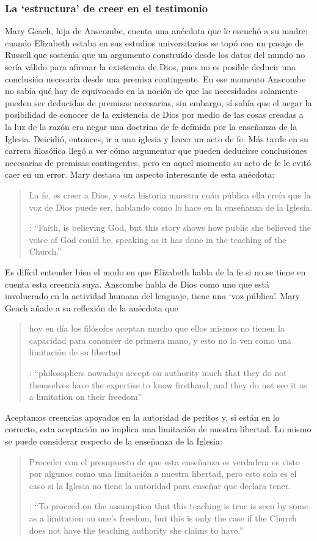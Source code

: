 \subsubsection{La `estructura' de creer en el testimonio}

Mary Geach, hija de Anscombe, cuenta una anécdota que le escuchó a su madre; cuando Elizabeth estaba en sus estudios universitarios se topó con un pasaje de Russell que sostenía que un argumento construído desde los datos del mundo no sería válido para afirmar la existencia de Dios, pues no es posible deducir una conclusión necesaria desde una premisa contingente. En ese momento Anscombe no sabía qué hay de equivocado en la noción de que las necesidades solamente pueden ser deducidas de premisas necesarias, sin embargo, sí sabía que el negar la posibilidad de conocer de la existencia de Dios por medio de las cosas creadas a la luz de la razón era negar una doctrina de fe definida por la enseñanza de la Iglesia. Deicidió, entonces, ir a una iglesia y hacer un acto de fe. Más tarde en su carrera filosófica llegó a ver cómo argumentar que pueden deducirse conclusiones necesarias de premisas contingentes, pero en aquel momento su acto de fe le evitó caer en un error. Mary destaca un aspecto interesante de esta anécdota: \blockquote[{\cite[xvi--xvii]{anscombe2008faith}}: \enquote{Faith, \textelp{} is believing God, but this story shows how public she believed the voice of God could be, speaking as it has done in the teaching of the Church.}]{La fe, \textelp{} es creer a Dios, y esta historia muestra cuán pública ella creía que la voz de Dios puede ser, hablando como lo hace en la enseñanza de la Iglesia.} Es difícil entender bien el modo en que Elizabeth habla de la fe si no se tiene en cuenta esta creencia suya. Anscombe habla de Dios como uno que está involucrado en la actividad humana del lenguaje, tiene una `voz pública'. Mary Geach añade a su reflexión de la anécdota que \blockquote[{\cite[xvii]{anscombe2008faith}}: \enquote{philosophers nowadays accept on authority much that they do not themselves have the expertise to know firsthand, and they do not see it as a limitation on their freedom}]{hoy en día los filósofos aceptan mucho que ellos mismos no tienen la capacidad para cononcer de primera mano, y esto no lo ven como una limitación de su libertad}. Aceptamos creencias apoyados en la autoridad de peritos y, si están en lo correcto, esta aceptación no implica una limitación de nuestra libertad. Lo mismo se puede considerar respecto de la enseñanza de la Iglesia: \blockquote[{\cite[xvi--xvii]{anscombe2008faith}}: \enquote{To proceed on the assumption that this teaching is true is seen by some as a limitation on one's freedom, but this is only the case if the Church does not have the teaching authority she claims to have.}]{Proceder con el presupuesto de que esta enseñanza es verdadera es visto por algunos como una limitación a nuestra libertad, pero esto solo es el caso si la Iglesia no tiene la autoridad para enseñar que declara tener.}

